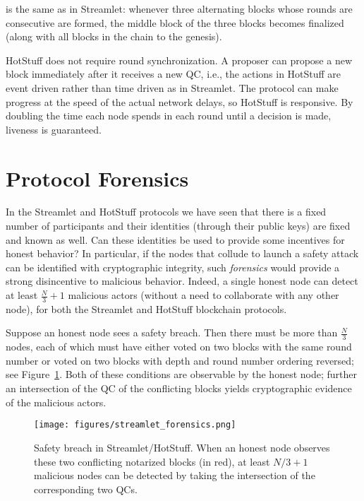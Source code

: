 \documentclass{article}
\begin{document}
 is the same as in Streamlet: whenever three alternating blocks whose rounds are consecutive are formed, the middle block of the three blocks becomes finalized (along with all blocks in the chain to the genesis).

 HotStuff does not require round synchronization. A proposer can propose a new block immediately after it receives a new QC, i.e., the actions in HotStuff are event driven rather than time driven as in Streamlet. The protocol can make progress at the speed of the actual network delays, so HotStuff is responsive. By doubling the time each node spends in each round until a decision is made, liveness is guaranteed.


\section*{Protocol Forensics}
In the Streamlet and HotStuff protocols we have seen that there is a fixed number of  participants and their identities (through their public keys) are fixed and known as well. Can these identities be used to provide some incentives for honest behavior? In particular, if the nodes that collude to launch a safety attack can  be identified with cryptographic integrity, such {\em forensics} would provide a strong  disincentive to malicious behavior. Indeed, a single honest node can detect at least $\frac{N}{3} + 1$ malicious actors (without a need to collaborate with any other node), for both the Streamlet and  HotStuff blockchain protocols. 

Suppose an honest node sees a safety breach.  
Then there must be more than $\frac{N}{3}$ nodes, each of which must have either voted on two blocks with the same round number or voted on two blocks with depth and round number ordering reversed; see Figure~\ref{fig:streamletfork}.  Both of these conditions  are observable by the honest node; further an intersection of the QC of the conflicting blocks yields cryptographic evidence of the malicious actors.  

\begin{figure}
    \centering
    \texttt{[image: figures/streamlet\_forensics.png]}
     \caption{Safety breach in Streamlet/HotStuff. When an honest node observes these two conflicting notarized blocks (in red), at least $N/3+1$ malicious nodes can be detected by taking the intersection of the corresponding two QCs.}
     \label{fig:streamletfork}
 \end{figure}
\end{document}
